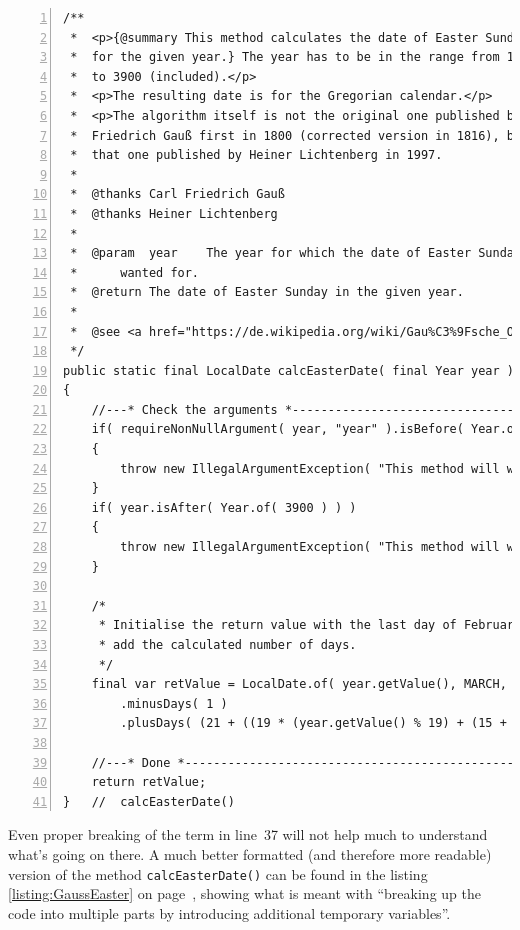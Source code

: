\documentclass[11pt,a4paper, titlepage, parskip=half, headsepline, footsepline, cleardoublepage=current, headheight=1cm]{scrbook}
\newcommand*{\tqvref}[1]{\hyperref[{#1}]{\ref*{#1}} on page~\pageref{#1}}
\begin{document}
\begin{lstlisting}[numbers=left]
/**
 *  <p>{@summary This method calculates the date of Easter Sunday 
 *  for the given year.} The year has to be in the range from 1583 
 *  to 3900 (included).</p>
 *  <p>The resulting date is for the Gregorian calendar.</p>
 *  <p>The algorithm itself is not the original one published by Carl
 *  Friedrich Gauß first in 1800 (corrected version in 1816), but
 *  that one published by Heiner Lichtenberg in 1997.
 *
 *  @thanks Carl Friedrich Gauß
 *  @thanks Heiner Lichtenberg  
 *
 *  @param  year    The year for which the date of Easter Sunday is 
 *      wanted for.
 *  @return The date of Easter Sunday in the given year.
 *  
 *  @see <a href="https://de.wikipedia.org/wiki/Gau%C3%9Fsche_Osterformel">Gaußsche Osterformel</a>
 */
public static final LocalDate calcEasterDate( final Year year )
{
    //---* Check the arguments *-------------------------------------    
    if( requireNonNullArgument( year, "year" ).isBefore( Year.of( 1583 ) ) )
    {
        throw new IllegalArgumentException( "This method will work only for years greater than or equal to 1583" );
    }
    if( year.isAfter( Year.of( 3900 ) ) )
    {
        throw new IllegalArgumentException( "This method will work only for years less than or equal to 3900" );
    }

    /*
     * Initialise the return value with the last day of February and 
     * add the calculated number of days.
     */
    final var retValue = LocalDate.of( year.getValue(), MARCH, 1 )
        .minusDays( 1 )
        .plusDays( (21 + ((19 * (year.getValue() % 19) + (15 + (3 * (year.getValue() / 100) + 3) / 4 - (8 * (year.getValue() / 100) + 13) / 25)) % 30) - (((19 * (year.getValue() % 19) + (15 + (3 * (year.getValue() / 100) + 3) / 4 - (8 * (year.getValue() / 100) + 13) / 25)) % 30) + (year.getValue() % 19) / 11) / 29) + (7 - ((21 + ((19 * (year.getValue() % 19) + (15 + (3 * (year.getValue() / 100) + 3) / 4 - (8 * (year.getValue() / 100) + 13) / 25)) % 30) - (((19 * (year.getValue() % 19) + (15 + (3 * (year.getValue() / 100) + 3) / 4 - (8 * (year.getValue() / 100) + 13) / 25)) % 30) + (year.getValue() % 19) / 11) / 29) - (7 - (year.getValue() + year.getValue() / 4 + (2 - (3 * (year.getValue() / 100) + 3) % 4)) % 7)) % 7) );

    //---* Done *----------------------------------------------------
    return retValue;
}   //  calcEasterDate()
\end{lstlisting}

Even proper breaking of the term in line~37 will not help much to understand what's going on there. A much better formatted (and therefore more readable) version of the method \lstinline|calcEasterDate()| can be found in the listing \tqvref{listing:GaussEaster}, showing what is meant with “breaking up the code into multiple parts by introducing additional temporary variables”.
\end{document}
